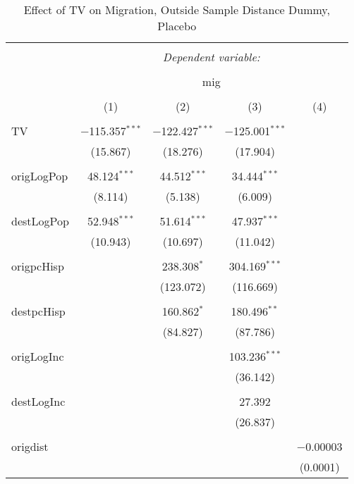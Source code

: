 
\begin{table}[!htbp] \centering 
  \caption{Effect of TV on Migration, Outside Sample Distance Dummy, Placebo} 
  \label{} 
\begin{tabular}{@{\extracolsep{5pt}}lcccc} 
\\[-1.8ex]\hline 
\hline \\[-1.8ex] 
 & \multicolumn{4}{c}{\textit{Dependent variable:}} \\ 
\cline{2-5} 
\\[-1.8ex] & \multicolumn{4}{c}{mig} \\ 
\\[-1.8ex] & (1) & (2) & (3) & (4)\\ 
\hline \\[-1.8ex] 
 TV & $-$115.357$^{***}$ & $-$122.427$^{***}$ & $-$125.001$^{***}$ &  \\ 
  & (15.867) & (18.276) & (17.904) &  \\ 
  & & & & \\ 
 origLogPop & 48.124$^{***}$ & 44.512$^{***}$ & 34.444$^{***}$ &  \\ 
  & (8.114) & (5.138) & (6.009) &  \\ 
  & & & & \\ 
 destLogPop & 52.948$^{***}$ & 51.614$^{***}$ & 47.937$^{***}$ &  \\ 
  & (10.943) & (10.697) & (11.042) &  \\ 
  & & & & \\ 
 origpcHisp &  & 238.308$^{*}$ & 304.169$^{***}$ &  \\ 
  &  & (123.072) & (116.669) &  \\ 
  & & & & \\ 
 destpcHisp &  & 160.862$^{*}$ & 180.496$^{**}$ &  \\ 
  &  & (84.827) & (87.786) &  \\ 
  & & & & \\ 
 origLogInc &  &  & 103.236$^{***}$ &  \\ 
  &  &  & (36.142) &  \\ 
  & & & & \\ 
 destLogInc &  &  & 27.392 &  \\ 
  &  &  & (26.837) &  \\ 
  & & & & \\ 
 origdist &  &  &  & $-$0.00003 \\ 
  &  &  &  & (0.0001) \\ 

\end{tabular}
\end{table}
